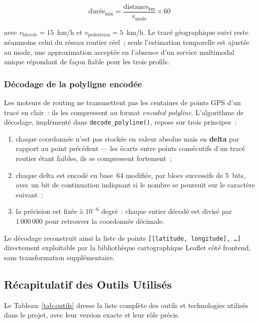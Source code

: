 \documentclass[12pt, a4paper]{report}
\begin{document}
\begin{equation}
  \text{durée}_{\min} = \frac{\text{distance}_{\text{km}}}{v_{\text{mode}}} \times 60
  \label{eq:duree-mode}
\end{equation}

avec $v_{\text{bicycle}} = 15$~km/h et $v_{\text{pedestrian}} = 5$~km/h. Le
tracé géographique suivi reste néanmoins celui du réseau routier réel~;
seule l'estimation temporelle est ajustée au mode, une approximation
acceptée en l'absence d'un service multimodal unique répondant de façon
fiable pour les trois profils.

\subsubsection{Décodage de la polyligne encodée}

Les moteurs de routing ne transmettent pas les centaines de points GPS d'un
tracé en clair~: ils les compressent au format \textit{encoded polyline}.
L'algorithme de décodage, implémenté dans \texttt{decode\_polyline()},
repose sur trois principes~:
\begin{enumerate}[itemsep=2pt, topsep=4pt, leftmargin=1.5cm]
  \item chaque coordonnée n'est pas stockée en valeur absolue mais en
    \textbf{delta} par rapport au point précédent --- les écarts entre
    points consécutifs d'un tracé routier étant faibles, ils se compressent
    fortement~;
  \item chaque delta est encodé en base~64 modifiée, par blocs successifs de
    5~bits, avec un bit de continuation indiquant si le nombre se poursuit
    sur le caractère suivant~;
  \item la précision est fixée à $10^{-6}$ degré~: chaque entier décodé est
    divisé par $1\,000\,000$ pour retrouver la coordonnée décimale.
\end{enumerate}
Le décodage reconstruit ainsi la liste de points
\texttt{[[latitude, longitude], \ldots]} directement exploitable par la
bibliothèque cartographique Leaflet côté frontend, sans transformation
supplémentaire.

\subsection{Récapitulatif des Outils Utilisés}
\label{ssec:outils-table}

Le Tableau~\ref{tab:outils} dresse la liste complète des outils et
technologies utilisés dans le projet, avec leur version exacte et leur
rôle précis.
\end{document}
